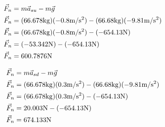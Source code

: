 \documentclass{article}
\begin{document}
\begin{multicols}{2}

    \begin{equation*}
        \begin{aligned}
            \vec{F}_{n} &= m \vec{a}_{su} - m \vec{g}\\
            \vec{F}_{n} &= (66.678 \unit{kg}) (-0.8\mss) - (66.68 \unit{kg})(-9.81\mss)\\
            \vec{F}_{n} &= (66.678 \unit{kg}) (-0.8\mss) -  (-654.13 \unit{N})\\
            \vec{F}_{n} &= (-53.342 \unit{N}) - (-654.13 \unit{N})\\
            \vec{F}_{n} &= 600.7876 \unit{N}
        \end{aligned}
    \end{equation*}


    \begin{equation*}
        \begin{aligned}
            \vec{F}_{n} &= m \vec{a}_{sd} - m \vec{g}\\
            \vec{F}_{n} &= (66.678 \unit{kg}) (0.3\mss) - (66.68 \unit{kg})(-9.81\mss)\\
            \vec{F}_{n} &= (66.678 \unit{kg}) (0.3\mss) - (-654.13 \unit{N})\\
            \vec{F}_{n} &= 20.003 \unit{N} - (-654.13 \unit{N})\\
            \vec{F}_{n} &= 674.133 \unit{N}
        \end{aligned}
    \end{equation*}

\end{multicols}
\end{document}

